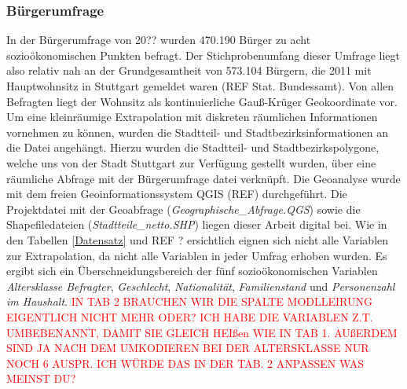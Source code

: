 \documentclass{Vorlage}
\begin{document}
\subsubsection{Bürgerumfrage}
In der Bürgerumfrage von 20?? wurden 470.190 Bürger zu acht sozioökonomischen Punkten befragt. Der Stichprobenumfang dieser Umfrage liegt also relativ nah an der Grundgesamtheit von 573.104 Bürgern, die 2011 mit Hauptwohnsitz in Stuttgart gemeldet waren (REF Stat. Bundessamt). Von allen Befragten liegt der Wohnsitz als kontinuierliche Gauß-Krüger Geokoordinate vor. Um eine kleinräumige Extrapolation mit diskreten räumlichen Informationen vornehmen zu können, wurden die Stadtteil- und Stadtbezirksinformationen an die Datei angehängt. Hierzu wurden die Stadtteil- und Stadtbezirkspolygone, welche uns von der Stadt Stuttgart zur Verfügung gestellt wurden, über eine räumliche Abfrage mit der Bürgerumfrage datei verknüpft. Die Geoanalyse wurde mit dem freien Geoinformationssystem QGIS (REF) durchgeführt. Die Projektdatei mit der Geoabfrage (\textit{Geographische\_Abfrage.QGS}) sowie die Shapefiledateien (\textit{Stadtteile\_netto.SHP}) liegen dieser Arbeit digital bei. Wie in den Tabellen \ref{Datensatz} und REF ? ersichtlich eignen sich nicht alle Variablen zur Extrapolation, da nicht alle Variablen in jeder Umfrag erhoben wurden. Es ergibt sich ein Überschneidungsbereich der fünf sozioökonomischen Variablen \textit{Altersklasse Befragter}, \textit{Geschlecht}, \textit{Nationalität}, \textit{Familienstand} und \textit{Personenzahl im Haushalt}. \textcolor{red}{IN TAB 2 BRAUCHEN WIR DIE SPALTE MODLLEIRUNG EIGENTLICH NICHT MEHR ODER? ICH HABE DIE VARIABLEN Z.T. UMBEBENANNT, DAMIT SIE GLEICH HEIßen WIE IN TAB 1. AUßERDEM SIND JA NACH DEM UMKODIEREN BEI DER ALTERSKLASSE NUR NOCH  6 AUSPR. ICH WÜRDE DAS IN DER TAB. 2 ANPASSEN WAS MEINST DU?}
\end{document}
